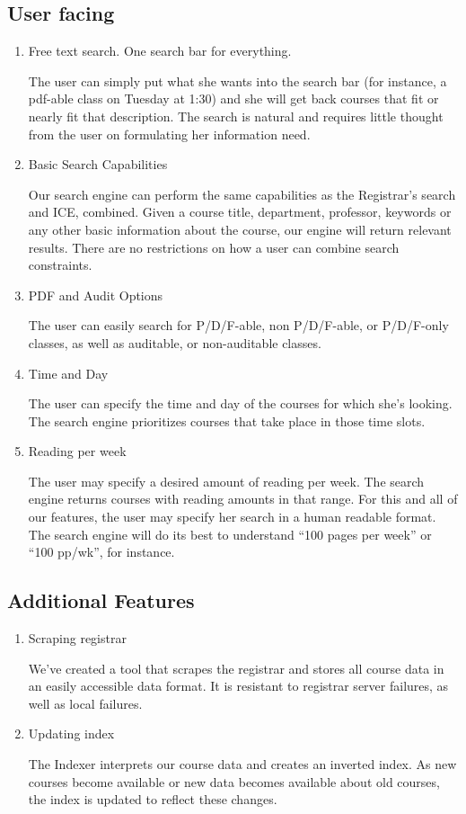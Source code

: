 \documentclass[12pt,letterpaper]{article}
\begin{document}
\subsection{User facing}
\begin{enumerate}
\item Free text search. One search bar for everything.
  
  The user can simply put what she wants into the search bar (for instance, a pdf-able class on Tuesday at 1:30) and she will get back courses that fit or nearly fit that description. The search is natural and requires little thought from the user on formulating her information need. 
  
\item Basic Search Capabilities
  
  Our search engine can perform the same capabilities as the Registrar's search and ICE, combined. Given a course title, department, professor, keywords or any other basic information about the course, our engine will return relevant results. There are no restrictions on how a user can combine search constraints.
  
\item PDF and Audit Options
  
  The user can easily search for P/D/F-able, non P/D/F-able, or P/D/F-only classes, as well as auditable, or non-auditable classes.
  
\item Time and Day
			  
  The user can specify the time and day of the courses for which she's looking. The search engine prioritizes courses that take place in those time slots.
  
\item Reading per week
  
  The user may specify a desired amount of reading per week. The search engine returns courses with reading amounts in that range. For this and all of our features, the user may specify her search in a human readable format. The search engine will do its best to understand ``100 pages per week'' or ``100 pp/wk'', for instance.
  
\end{enumerate}

\subsection{Additional Features}
\begin{enumerate}
\item Scraping registrar 
  
  We've created a tool that scrapes the registrar and stores all course data in an easily accessible data format. It is resistant to registrar server failures, as well as local failures.
			
\item Updating index 
  
  The Indexer interprets our course data and creates an inverted index. As new courses become available or new data becomes available about old courses, the index is updated to reflect these changes.
  
\end{enumerate}
\end{document}
